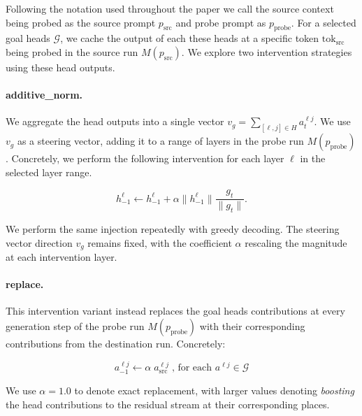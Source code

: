 Following the notation used throughout the paper we call the source context being probed as the source prompt $p_\mathrm{src}$ and probe prompt as $p_\mathrm{probe}$. For a selected goal heads $\mathcal{G}$, we cache the output of each these heads at a specific token $\mathrm{tok}_{\mathrm{src}}$ being probed in the source run $M(p_\mathrm{src})$. We explore two intervention strategies using these head outputs.

\paragraph{additive\_norm.} We aggregate the head outputs into a single vector $v_g=\sum_{[\ell,j]\in H}a_t^{\ell j}$. We use  $v_g$ as a steering vector, adding it to a range of layers in the probe run $M(p_\mathrm{probe})$. Concretely, we perform the following intervention for each layer $\ell$ in the selected layer range.

\begin{equation}
h^{\ell}_{-1}\leftarrow h^{\ell}_{-1}+\alpha\|h^{\ell}_{-1}\|\frac{g_t}{\|g_t\|}.
\label{eqn:additive-norm}
\end{equation}

We perform the same injection repeatedly with greedy decoding. The steering vector direction $v_g$ remains fixed, with the coefficient $\alpha$ rescaling the magnitude at each intervention layer.


\paragraph{replace.} This intervention variant instead replaces the goal heads contributions at every generation step of the probe run $M(p_\mathrm{probe})$ with their corresponding contributions from the destination run. Concretely:

\begin{equation}
a^{\ell j}_{-1}\leftarrow \alpha \; a^{\ell j}_\mathrm{src}\;\text{, for each  } a^{\ell j} \in \mathcal{G}
\label{eqn:replace}
\end{equation}

We use $\alpha=1.0$ to denote exact replacement, with larger values denoting \textit{boosting} the head contributions to the residual stream at their corresponding places. 

